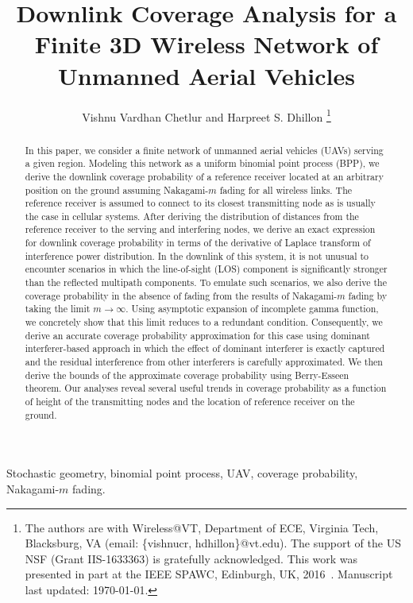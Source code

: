 \documentclass[journal,draftclsnofoot,onecolumn,12pt]{IEEEtran}
\begin{document}
\graphicspath{{./Figures/}}
\title{
Downlink Coverage Analysis for a Finite 3D Wireless Network of Unmanned Aerial Vehicles
}
\author{
Vishnu Vardhan Chetlur and Harpreet S. Dhillon
\thanks{The authors are with Wireless@VT, Department of ECE, Virginia Tech, Blacksburg, VA (email: \{vishnucr, hdhillon\}@vt.edu). The support of the US NSF (Grant IIS-1633363) is gratefully acknowledged.
This work was presented in part at the IEEE SPAWC, Edinburgh, UK, 2016~\cite{vishnu}. \hfill Manuscript last updated: \today.}
}
\maketitle

\begin{abstract}
In this paper, we consider a finite network of unmanned aerial vehicles (UAVs) serving a given region. Modeling this network as a uniform binomial point process (BPP), we derive the downlink coverage probability of a reference receiver located at an arbitrary position on the ground assuming Nakagami-$m$ fading for all wireless links. The reference receiver is assumed to connect to its closest transmitting node as is usually the case in cellular systems. After deriving the distribution of distances from the reference receiver to the serving and interfering nodes, we derive an exact expression for downlink coverage probability in terms of the derivative of Laplace transform of interference power distribution. In the downlink of this system, it is not unusual to encounter scenarios in which the line-of-sight (LOS) component is significantly stronger than the reflected multipath components. To emulate such scenarios, we also derive the coverage probability in the absence of fading from the results of Nakagami-$m$ fading by taking the limit $m \to \infty$. Using asymptotic expansion of incomplete gamma function, we concretely show that this limit reduces to a redundant condition. Consequently, we derive an accurate coverage probability approximation for this case using dominant interferer-based approach in which the effect of dominant interferer is exactly captured and the residual interference from other interferers is carefully approximated. We then derive the bounds of the approximate coverage probability using Berry-Esseen theorem. Our analyses reveal several useful trends in coverage probability as a function of height of the transmitting nodes and the location of reference receiver on the ground.
\end{abstract}
\begin{IEEEkeywords}
Stochastic geometry, binomial point process, UAV, coverage probability, Nakagami-$m$ fading.
\end{IEEEkeywords}
\end{document}
